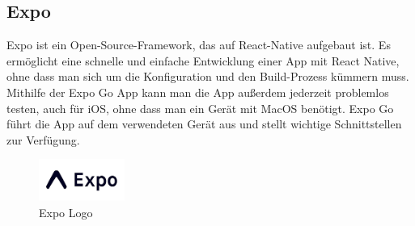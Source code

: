\subsection{Expo}
\label{sec:expo}

Expo ist ein \Gls{Open-Source}-\Gls*{Framework}, das auf React-Native aufgebaut ist. Es ermöglicht eine schnelle und einfache Entwicklung einer App mit React Native, ohne dass man sich um die Konfiguration und den Build-Prozess kümmern muss.  \\
Mithilfe der Expo Go App kann man die App außerdem jederzeit problemlos testen, auch für iOS, ohne dass man ein Gerät mit MacOS benötigt. Expo Go führt die App auf dem verwendeten Gerät aus und stellt wichtige Schnittstellen zur Verfügung.  \\

\begin{figure}[H]
    \centering
    \includegraphics[width=0.25\textwidth]{images/expologo.png}
    \caption{Expo Logo }
    \label{fig:expo logo}
\end{figure}
